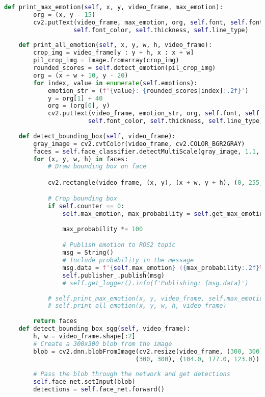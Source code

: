 \begin{lstlisting}[language=Python, caption={Python skript pre rozpoznávanie emócií}, label={lst:emotion-recognition}]
    def print_max_emotion(self, x, y, video_frame, max_emotion):
        org = (x, y - 15)
        cv2.putText(video_frame, max_emotion, org, self.font, self.font_scale, 
                   self.font_color, self.thickness, self.line_type)
        
    def print_all_emotion(self, x, y, w, h, video_frame):
        crop_img = video_frame[y : y + h, x : x + w]
        pil_crop_img = Image.fromarray(crop_img)
        rounded_scores = self.detect_emotion(pil_crop_img)
        org = (x + w + 10, y - 20)
        for index, value in enumerate(self.emotions):
            emotion_str = (f'{value}: {rounded_scores[index]:.2f}')
            y = org[1] + 40
            org = (org[0], y)
            cv2.putText(video_frame, emotion_str, org, self.font, self.font_scale, 
                       self.font_color, self.thickness, self.line_type)
        
    def detect_bounding_box(self, video_frame):
        gray_image = cv2.cvtColor(video_frame, cv2.COLOR_BGR2GRAY)
        faces = self.face_classifier.detectMultiScale(gray_image, 1.1, 5, minSize=(40, 40))
        for (x, y, w, h) in faces:
            # Draw bounding box on face

            cv2.rectangle(video_frame, (x, y), (x + w, y + h), (0, 255, 0), 2)

            # Crop bounding box
            if self.counter == 0:
                self.max_emotion, max_probability = self.get_max_emotion(x, y, w, h, video_frame)
                
                max_probability *= 100

                # Publish emotion to ROS2 topic
                msg = String()
                # Include probability in the message
                msg.data = f'{self.max_emotion} ({max_probability:.2f}%)'
                self.publisher_.publish(msg)
                # self.get_logger().info(f'Publishing: {msg.data}')
            
            # self.print_max_emotion(x, y, video_frame, self.max_emotion) 
            # self.print_all_emotion(x, y, w, h, video_frame)
    
        return faces
    def detect_bounding_box_sgg(self, video_frame):
        h, w = video_frame.shape[:2]
        # Create a 300x300 blob from the image
        blob = cv2.dnn.blobFromImage(cv2.resize(video_frame, (300, 300)), 1.0,
                                    (300, 300), (104.0, 177.0, 123.0))
        
        # Pass the blob through the network and get detections
        self.face_net.setInput(blob)
        detections = self.face_net.forward()
        

\end{lstlisting}

